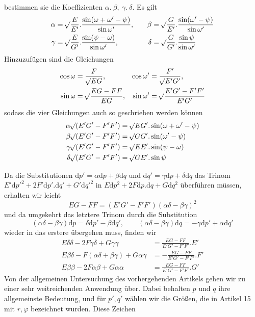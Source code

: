 %
bestimmen sie die Koeffizienten \(\alpha\mathord{.}\ \beta,\ \gamma\mathord{.}\ \delta\). Es gilt
\[
\begin{aligned}
\alpha&=\mathord{{}^{}\!\surd}\frac{E}{E'}\mathord{.}\frac{\sin(\omega+\omega'-\psi)}{\sin\omega'},&\quad\beta&=\mathord{{}^{}\!\surd}\frac{G}{E'}\mathord{.}\frac{\sin(\omega'-\psi)}{\sin\omega'}\\
\gamma&=\mathord{{}^{}\!\surd}\frac{E}{G'}\mathord{.}\frac{\sin(\psi-\omega)}{\sin\omega'},&\delta&=\mathord{{}^{}\!\surd}\frac{G}{G'}\mathord{.}\frac{\sin\psi}{\sin\omega'}
\end{aligned}
\]
Hinzuzufügen sind die Gleichungen
\[
\begin{aligned}
\cos\omega&=\frac{F}{\mathord{{}^{}\!\surd}EG},&\cos\omega'&=\frac{F'}{\mathord{{}^{}\!\surd}E'G'},\\
\sin\omega&=\mathord{{}^{}\!\surd}\frac{EG-FF}{EG},&\sin\omega'&=\mathord{{}^{}\!\surd}\frac{E'G'-F'F'}{E'G'}
\end{aligned}
\]
sodass die vier Gleichungen auch so geschrieben werden können
\[
\begin{aligned}
\alpha\BareRoot{(E'G'-F'F')}&=\BareRoot{EG'}\mathord{.}\sin(\omega+\omega'-\psi)\\
\beta\BareRoot{(E'G'-F'F')}&=\BareRoot{GG'}\mathord{.}\sin(\omega'-\psi)\\
\gamma\BareRoot{(E'G'-F'F')}&=\BareRoot{EE'}\mathord{.}\sin(\psi-\omega)\\
\delta\BareRoot{(E'G'-F'F')}&=\BareRoot{GE'}\mathord{.}\sin\psi
\end{aligned}
\]

Da die Substitutionen \(\mathrm{d}p'=\alpha\mathrm{d}p+\beta\mathrm{d}q\) und \(\mathrm{d}q'=\gamma\mathrm{d}p+\delta\mathrm{d}q\) das Trinom \(E'\mathrm{d}p'^2+2F'\mathrm{d}p'\mathord{.}\mathrm{d}q'+G'\mathrm{d}q'^2\) in \(E\mathrm{d}p^2+2F\mathrm{d}p\mathord{.}\mathrm{d}q+G\mathrm{d}q^2\) überführen müssen, erhalten wir leicht
\[
EG-FF=(E'G'-F'F')(\alpha\delta-\beta\gamma)^2
\]
und da umgekehrt das letztere Trinom durch die Substitution
\[
(\alpha\delta-\beta\gamma)\mathrm{d}p=\delta\mathrm{d}p'-\beta\mathrm{d}q',\qquad(\alpha\delta-\beta\gamma)\mathrm{d}q=-\gamma\mathrm{d}p'+\alpha\mathrm{d}q'
\]
wieder in das erstere übergehen muss, finden wir
\[
\begin{aligned}
E\delta\delta-2F\gamma\delta+G\gamma\gamma&=\frac{EG-FF}{E'G'-F'F'}\mathord{.}E'\\
E\beta\delta-F(\alpha\delta+\beta\gamma)+G\alpha\gamma&=-\frac{EG-FF}{E'G'-F'F'}\mathord{.}F'\\
E\beta\beta-2F\alpha\beta+G\alpha\alpha&=\frac{EG-FF}{E'G'-F'F'}\mathord{.}G'
\end{aligned}
\]
Von der allgemeinen Untersuchung des vorhergehenden Artikels gehen wir zu einer sehr weitreichenden Anwendung über. Dabei behalten \(p\) und \(q\) ihre allgemeinste Bedeutung, und für \(p',q'\) wählen wir die Größen, die in Artikel 15 mit \(r,\varphi\) bezeichnet wurden. Diese Zeichen
